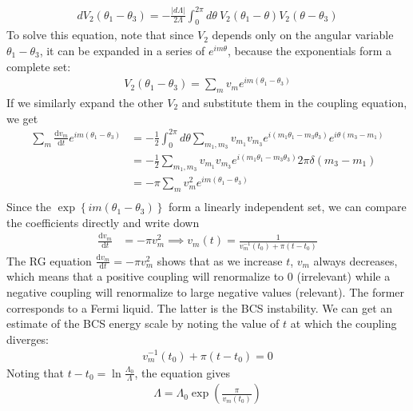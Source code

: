 \documentclass[12pt]{article}
\begin{document}
\begin{equation}\begin{aligned}
	dV_2(\theta_1 - \theta_3) = -\frac{|d\Lambda|}{2\Lambda}  \int_0^{2\pi} d\theta~ V_2(\theta_1 - \theta) V_2(\theta - \theta_3)
\end{aligned}\end{equation}
To solve this equation, note that since \(V_2\) depends only on the angular variable \(\theta_1 - \theta_3\), it can be expanded in a series of \(e^{im\theta}\), because the exponentials form a complete set:
\begin{equation}\begin{aligned}
	V_2(\theta_1 - \theta_3) = \sum_m v_m e^{im\left(\theta_1 - \theta_3\right)}
\end{aligned}\end{equation}
If we similarly expand the other \(V_2\) and substitute them in the coupling equation, we get
\begin{equation}\begin{aligned}
	\sum_m \frac{\mathrm{d}v_m}{\mathrm{d}t} e^{im\left(\theta_1 - \theta_3\right)} &= -\frac{1}{2}\int_0^{2\pi} d\theta \sum_{m_1,m_3}v_{m_1}v_{m_3}e^{i\left(m_1\theta_1 - m_3\theta_3\right)}e^{i\theta\left(m_3 - m_1\right)}\\
											   &=-\frac{1}{2}\sum_{m_1,m_3}v_{m_1}v_{m_3}e^{i\left(m_1\theta_1 - m_3\theta_3\right)}2\pi \delta\left(m_3 - m_1\right)\\
											   &=-\pi\sum_{m}v_m^2e^{im\left(\theta_1 - \theta_3\right)}\\
\end{aligned}\end{equation}
Since the \(\exp\left\{im\left(\theta_1 - \theta_3\right)\right\}\) form a linearly independent set, we can compare the coefficients directly and write down
\begin{equation}\begin{aligned}
\label{rgeq}
\frac{\mathrm{d}v_m}{\mathrm{d}t} &= -\pi v^2_{m} \implies v_m(t) = \frac{1}{v_m^{-1}(t_0) + \pi \left( t - t_0 \right) }
\end{aligned}\end{equation}
The RG equation \(\frac{\mathrm{d}v_m}{\mathrm{d}t} = -\pi v^2_{m}\) shows that as we increase \(t\), \(v_m\) always decreases, which means that a positive coupling will renormalize to 0 (irrelevant) while a negative coupling will renormalize to large negative values (relevant). The former corresponds to a Fermi liquid. The latter is the BCS instability. We can get an estimate of the BCS energy scale by noting the value of \(t\) at which the coupling diverges:
\begin{equation}\begin{aligned}
	v_m^{-1}(t_0) + \pi \left( t - t_0 \right)  = 0
\end{aligned}\end{equation}
Noting that \(t - t_0 = \ln \frac{\Lambda_0}{\Lambda}\), the equation gives
\begin{equation}\begin{aligned}
	\Lambda = \Lambda_0 \exp\left(\frac{\pi}{v_m(t_0)}\right)
\end{aligned}\end{equation}
\end{document}
